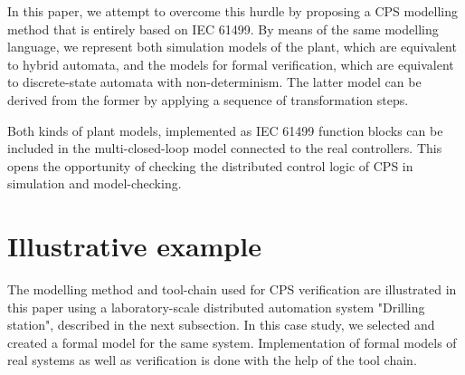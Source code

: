 \documentclass[conference]{IEEEtran}
\begin{document}
In this paper, we attempt to overcome this hurdle by proposing a CPS modelling method that is entirely based on IEC 61499. By means of the same modelling language, we represent both simulation models of the plant, which are equivalent to hybrid automata, and the models for formal verification, which are equivalent to discrete-state automata with non-determinism. 
The latter model can be derived from the former by applying a sequence of transformation steps. 

Both kinds of plant models, implemented as IEC 61499 function blocks can be included in the multi-closed-loop model connected to the real controllers. This opens the opportunity of checking the distributed control logic of CPS in simulation and model-checking.  

\section{Illustrative example}

The modelling method and tool-chain used for CPS verification are illustrated in this paper using a laboratory-scale distributed automation system "Drilling station", described in the next subsection. In this case study, we selected and created a formal model for the same system. Implementation of formal models of real systems as well as verification is done with the help of the tool chain. 

\end{document}
